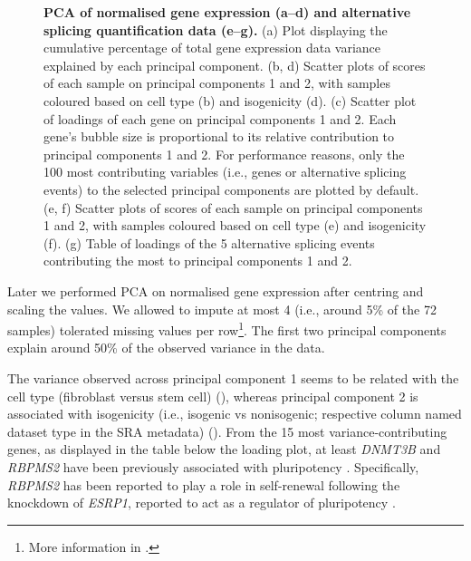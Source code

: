 \begin{figure}[!ht]
    \caption[Principal component analysis]{\textbf{PCA of normalised gene expression (a–d) and alternative splicing quantification data (e–g).} (a) Plot displaying the cumulative percentage of total gene expression data variance explained by each principal component. (b, d) Scatter plots of scores of each sample on principal components 1 and 2, with samples coloured based on cell type (b) and isogenicity (d). (c) Scatter plot of loadings of each gene on principal components 1 and 2. Each gene’s bubble size is proportional to its relative contribution to principal components 1 and 2. For performance reasons, only the 100 most contributing variables (i.e., genes or alternative splicing events) to the selected principal components are plotted by default. (e, f) Scatter plots of scores of each sample on principal components 1 and 2, with samples coloured based on cell type (e) and isogenicity (f). (g) Table of loadings of the 5 alternative splicing events contributing the most to principal components 1 and 2.}
    \label{fig:psichomics-pca}
\end{figure}


Later we performed PCA on normalised gene expression after centring and scaling the values. We allowed to impute at most 4 (i.e., around 5\% of the 72 samples) tolerated missing values per row\footnote{More information in .}. The first two principal components explain around 50\% of the observed variance in the data.

The variance observed across principal component 1 seems to be related with the cell type (fibroblast versus stem cell) (), whereas principal component 2 is associated with isogenicity (i.e., isogenic vs nonisogenic; respective column named dataset type in the SRA metadata) (). From the 15 most variance-contributing genes, as displayed in the table below the loading plot, at least \emph{DNMT3B} and \emph{RBPMS2} have been previously associated with pluripotency \cite{fagoonee:2013vx}. Specifically, \emph{RBPMS2} has been reported to play a role in self-renewal following the knockdown of \emph{ESRP1}, reported to act as a regulator of pluripotency \cite{fagoonee:2013vx}.

